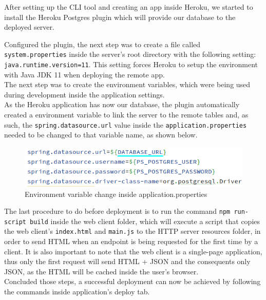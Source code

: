 After setting up the CLI tool and creating an app inside Heroku, we started to install the Heroku Postgres plugin which will provide our database to the
deployed server.

Configured the plugin, the next step was to create a file called \texttt{system.properties} inside
the server's root directory with the following setting: \texttt{java.runtime.version=11}. This setting forces Heroku to setup the
environment with Java JDK 11 when deploying the remote app.\\

The next step was to create the environment variables, which were being used during development inside the 
application settings.\\

As the Heroku application has now our database, the plugin automatically created a environment variable to link the server to the remote
tables and, as such, the \texttt{spring.datasource.url} value inside the \texttt{application.properties} needed to be changed to that 
variable name, as shown below.\\

\begin{figure}[H]
    \begin{center}
        \includegraphics[scale=0.5]{_figures/heroku-env-db.png}
        \caption{Environment variable change inside application.properties} 
    \end{center}
\end{figure}

The last procedure to do before deployment is to run the command \texttt{npm run-script build}
inside the web client folder, which will execute a script that copies the web client's 
\texttt{index.html} and \texttt{main.js} to the HTTP server resources folder, in order to 
send HTML when an endpoint is being requested for the first time by a client. It is also important
to note that the web client is a single-page application, thus only the first request will send
HTML + JSON and the consequents only JSON, as the HTML will be cached inside the user's browser.\\

Concluded those steps, a successful deployment can now be achieved by following the commands inside
application's deploy tab.


